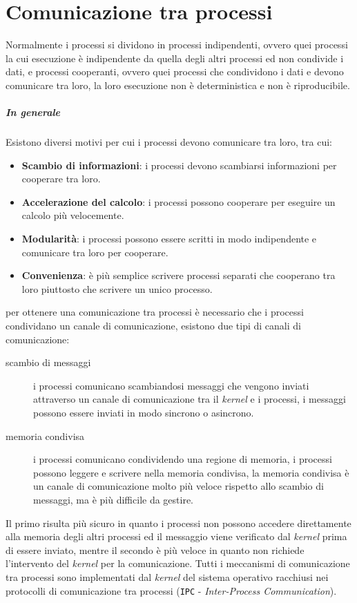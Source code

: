 \chapter{Comunicazione tra processi}

Normalmente i processi si dividono in processi indipendenti, ovvero quei processi la cui esecuzione è indipendente da quella degli altri processi ed non condivide i dati, e processi cooperanti, ovvero quei processi che condividono i dati e devono comunicare tra loro, la loro esecuzione non è deterministica e non è riproducibile.
\paragraph{In generale}
    Esistono diversi motivi per cui i processi devono comunicare tra loro, tra cui:
    \begin{itemize}
        \item \textbf{Scambio di informazioni}: i processi devono scambiarsi informazioni per cooperare tra loro.
        \item \textbf{Accelerazione del calcolo}: i processi possono cooperare per eseguire un calcolo più velocemente.
        \item \textbf{Modularità}: i processi possono essere scritti in modo indipendente e comunicare tra loro per cooperare.
        \item \textbf{Convenienza}: è più semplice scrivere processi separati che cooperano tra loro piuttosto che scrivere un unico processo.
    \end{itemize}
    per ottenere una comunicazione tra processi è necessario che i processi condividano un canale di comunicazione, esistono due tipi di canali di comunicazione:
    \begin{description}
        \item[scambio di messaggi] i processi comunicano scambiandosi messaggi che vengono inviati attraverso un canale di comunicazione tra il \textit{kernel} e i processi, i messaggi possono essere inviati in modo sincrono o asincrono.
        \item[memoria condivisa] i processi comunicano condividendo una regione di memoria, i processi possono leggere e scrivere nella memoria condivisa, la memoria condivisa è un canale di comunicazione molto più veloce rispetto allo scambio di messaggi, ma è più difficile da gestire.
    \end{description}
    Il primo risulta più sicuro in quanto i processi non possono accedere direttamente alla memoria degli altri processi ed il messaggio viene verificato dal \textit{kernel} prima di essere inviato, mentre il secondo è più veloce in quanto non richiede l'intervento del \textit{kernel} per la comunicazione.\newline
    Tutti i meccanismi di comunicazione tra processi sono implementati dal \textit{kernel} del sistema operativo racchiusi nei protocolli di comunicazione tra processi (\texttt{IPC} - \textit{Inter-Process Communication}).

